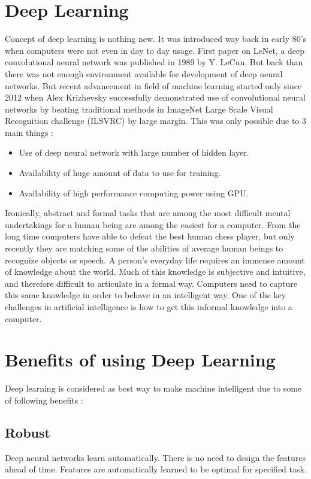 \section{Deep Learning}

Concept of deep learning is nothing new. It was introduced way back in early 80's when computers were not even in day to day usage. First paper on LeNet, a deep convolutional neural network was published in 1989 by Y. LeCun. But back than there was not enough environment available for development of deep neural networks. But recent advancement in field of machine learning started only since 2012 when Alex Krizhevsky successfully demonstrated use of convolutional neural networks by beating traditional methods in ImageNet Large Scale Visual Recognition challenge (ILSVRC) by large margin. This was only possible due to 3 main things \cite{Gettingstartdeeplearninig}:

\begin{itemize}
  \item Use of deep neural network with large number of hidden layer.
  \item Availability of huge amount of data to use for training.
  \item Availability of high performance computing power using GPU.
\end{itemize}

 Ironically, abstract and formal tasks that are among the most difficult mental undertakings for a human being are among the easiest for a computer. From the long time computers have able to defeat the best human chess player, but only recently they are matching some of the abilities of average human beings to recognize objects or speech. A person's everyday life requires an immense amount of knowledge about the world. Much of this knowledge is subjective and intuitive, and therefore difficult to articulate in a formal way. Computers need to capture this same knowledge in order to behave in an intelligent way. One of the key challenges in artificial intelligence is how to get this informal knowledge into a computer.

\section{Benefits of using Deep Learning}
Deep learning is considered as best way to make machine intelligent due to some of following benefits \cite{Gettingstartdeeplearninig}:
\subsection{Robust}
Deep neural networks learn automatically. There is no need to design the features ahead of time. Features are automatically learned to be optimal for specified task.
